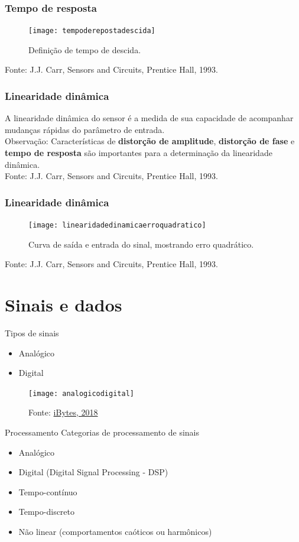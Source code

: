 \documentclass[t]{beamer}
\begin{document}
\begin{frame}
	\frametitle{Tempo de resposta}
	\begin{figure}
		\texttt{[image: tempoderepostadescida]}
		\caption{Definição de tempo de descida.}
	\end{figure}  	
	{\scriptsize Fonte: J.J. Carr, Sensors and Circuits, Prentice Hall, 1993.}
\end{frame}

\begin{frame}
	\frametitle{Linearidade dinâmica}
	A linearidade dinâmica do sensor é a medida de sua capacidade de acompanhar mudanças rápidas do parâmetro de entrada.\\
	\bigskip
	Observação:	Características de \textbf{distorção de amplitude}, \textbf{distorção de fase} e \textbf{tempo de resposta} são importantes para a determinação da linearidade dinâmica.\\
	\bigskip
	{\scriptsize Fonte: J.J. Carr, Sensors and Circuits, Prentice Hall, 1993.}
\end{frame}

\begin{frame}
	\frametitle{Linearidade dinâmica}
	\begin{figure}
		\texttt{[image: linearidadedinamicaerroquadratico]}
		\caption{Curva de saída e entrada do sinal, mostrando erro quadrático.}
	\end{figure}  	
	{\scriptsize Fonte: J.J. Carr, Sensors and Circuits, Prentice Hall, 1993.}
\end{frame}


\section{Sinais e dados}

\begin{frame}{Tipos de sinais}
	\begin{itemize}
		\item Analógico
		\item Digital
	\end{itemize}
	\begin{figure}
		\texttt{[image: analogicodigital]}
		
		{\scriptsize Fonte: \href{http://www.ibytes.com.br/as-diferencas-entre-eletronica-analogica-e-eletronica-digital/}{iBytes, 2018}}
	\end{figure}	
\end{frame}

\begin{frame}{Processamento}
	Categorias de processamento de sinais
	\begin{itemize}
		\item Analógico
		\item Digital (Digital Signal Processing - DSP)
		\item Tempo-contínuo
		\item Tempo-discreto
		\item Não linear (comportamentos caóticos ou harmônicos)
	\end{itemize}
\end{frame}
\end{document}
